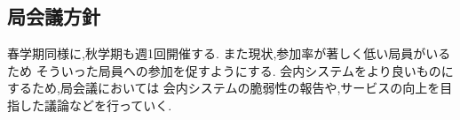 \subsection*{局会議方針}

春学期同様に,秋学期も週1回開催する.
また現状,参加率が著しく低い局員がいるため
そういった局員への参加を促すようにする.
会内システムをより良いものにするため,局会議においては
会内システムの脆弱性の報告や,サービスの向上を目指した議論などを行っていく.
